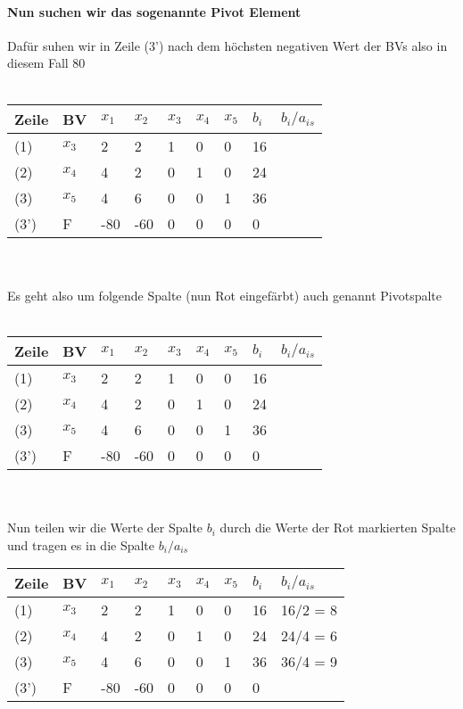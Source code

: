 \documentclass{article}
\begin{document}
\paragraph{Nun suchen wir das sogenannte Pivot Element}
Dafür suhen wir in Zeile (3') nach dem höchsten negativen Wert der BVs also in diesem Fall 80\\\\
\begin{tabular}{|l|l|l|l|l|l|l|l|l|}
	\hline
	Zeile & BV & $x_{1}$&$x_{2}$&$x_{3}$&$x_{4}$&$x_{5}$&$b_{i}$&$b_{i}/a_{is}$\\
	\hline
	(1)&$x_{3}$&2&2&1&0&0&16& \\
	\hline
	(2)&$x_{4}$&4&2&0&1&0&24& \\
	\hline
	(3)&$x_{5}$&4&6&0&0&1&36& \\
	\hline
	(3')&F&\cellcolor{red}-80&-60&0&0&0&0&\\
	\hline
\end{tabular}\\\\
Es geht also um folgende Spalte (nun Rot eingefärbt) auch genannt Pivotspalte\\\\
\begin{tabular}{|l|l|l|l|l|l|l|l|l|}
	\hline
	Zeile & BV & $x_{1}$&$x_{2}$&$x_{3}$&$x_{4}$&$x_{5}$&$b_{i}$&$b_{i}/a_{is}$\\
	\hline
	(1)&$x_{3}$&\cellcolor{red}2&2&1&0&0&16& \\
	\hline
	(2)&$x_{4}$&\cellcolor{red}4&2&0&1&0&24& \\
	\hline
	(3)&$x_{5}$&\cellcolor{red}4&6&0&0&1&36& \\
	\hline
	(3')&F&\cellcolor{red}-80&-60&0&0&0&0&\\
	\hline
\end{tabular}\\\\
Nun teilen wir die Werte der Spalte $b_{i}$ durch die Werte der Rot markierten Spalte und tragen es in die Spalte $b_{i}/a_{is}$\\ 
\begin{tabular}{|l|l|l|l|l|l|l|l|l|}
	\hline
	Zeile & BV & $x_{1}$&$x_{2}$&$x_{3}$&$x_{4}$&$x_{5}$&$b_{i}$&$b_{i}/a_{is}$\\
	\hline
	(1)&$x_{3}$&\cellcolor{red}2&2&1&0&0&16&16/2 = 8\\
	\hline
	(2)&$x_{4}$&\cellcolor{red}4&2&0&1&0&24&24/4 = 6\\
	\hline
	(3)&$x_{5}$&\cellcolor{red}4&6&0&0&1&36&36/4 = 9\\
	\hline
	(3')&F&\cellcolor{red}-80&-60&0&0&0&0&\\
	\hline
\end{tabular}\\\\
\end{document}
